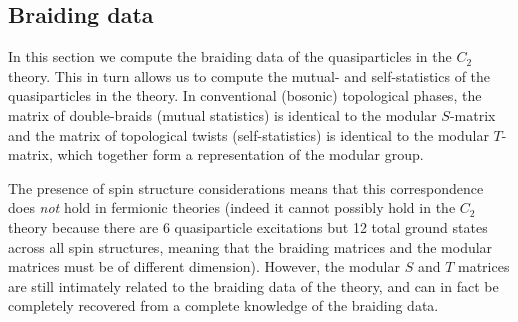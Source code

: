 \documentclass[12pt,a4paper]{article}
\newcommand\be            {\begin{equation}}
\newcommand\ee            {\end{equation}}
\begin{document}

\subsection{Braiding data} \label{C2_braiding}

In this section we compute the braiding data of the quasiparticles in the $C_2$ theory.
This in turn allows us to compute the mutual- and self-statistics of the quasiparticles in the theory.
In conventional (bosonic) topological phases, the matrix of double-braids (mutual statistics) 
is identical to the modular $S$-matrix and the matrix of topological twists (self-statistics) is identical to the 
modular $T$-matrix, which together form a representation of the modular group.  

The presence of spin structure considerations means that this correspondence does {\it not} 
hold in fermionic theories (indeed it cannot possibly hold in the $C_2$ theory because there are 6 quasiparticle excitations but 12 total ground states across all spin structures, meaning that the braiding matrices and the modular matrices must be of different dimension). 
However, the modular $S$ and $T$ matrices are still intimately related to the braiding data of the theory, and
can in fact be completely recovered from a complete knowledge of the braiding data.
\end{document}
